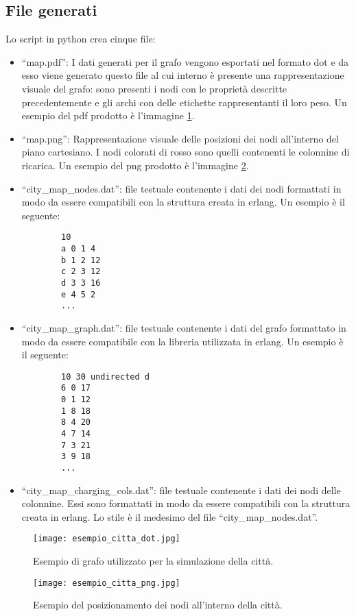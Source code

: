 \subsection{File generati}
Lo script in python crea cinque file:
\begin{itemize}
	\item ``map.pdf'': I dati generati per il grafo vengono esportati nel formato dot e da esso viene generato questo file al cui interno è presente una rappresentazione visuale del grafo: sono presenti i nodi con le proprietà descritte precedentemente e gli archi con delle etichette rappresentanti il loro peso. Un esempio del pdf prodotto è l'immagine \ref{fig:esempio_citta_dot}.
	\item ``map.png'': Rappresentazione visuale delle posizioni dei nodi all'interno del piano cartesiano. I nodi colorati di rosso sono quelli contenenti le colonnine di ricarica. Un esempio del png prodotto è l'immagine \ref{fig:esempio_citta_png}.
	\item ``city\_map\_nodes.dat'': file testuale contenente i dati dei nodi formattati in modo da essere compatibili con la struttura creata in erlang. Un esempio è il seguente:
	\begin{lstlisting}
		10
		a 0 1 4
		b 1 2 12
		c 2 3 12
		d 3 3 16
		e 4 5 2
		...
	\end{lstlisting}
	\item ``city\_map\_graph.dat'': file testuale contenente i dati del grafo formattato in modo da essere compatibile con la libreria utilizzata in erlang. Un esempio è il seguente:
	\begin{lstlisting}
		10 30 undirected d
		6 0 17
		0 1 12
		1 8 18
		8 4 20
		4 7 14
		7 3 21
		3 9 18
		...
	\end{lstlisting}
	\item ``city\_map\_charging\_cols.dat'': file testuale contenente i dati dei nodi delle colonnine. Essi sono formattati in modo da essere compatibili con la struttura creata in erlang. Lo stile è il medesimo del file ``city\_map\_nodes.dat''.
	
\end{itemize}

\begin{figure}[htbp]
	\centering
	\texttt{[image: esempio\_citta\_dot.jpg]}
	\caption{Esempio di grafo utilizzato per la simulazione della città.}
	\label{fig:esempio_citta_dot}
\end{figure}


\begin{figure}[htbp]
	\centering
	\texttt{[image: esempio\_citta\_png.jpg]}
	\caption{Esempio del posizionamento dei nodi all'interno della città.}
	\label{fig:esempio_citta_png}
\end{figure}

